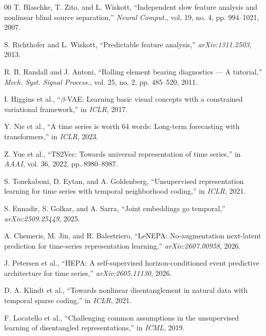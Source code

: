 \documentclass[conference]{IEEEtran}
\begin{document}
\begin{thebibliography}{00}
 T. Blaschke, T. Zito, and L. Wiskott, ``Independent slow feature analysis and nonlinear blind source separation,'' \emph{Neural Comput.}, vol. 19, no. 4, pp. 994--1021, 2007.

 S. Richthofer and L. Wiskott, ``Predictable feature analysis,'' \emph{arXiv:1311.2503}, 2013.

 R. B. Randall and J. Antoni, ``Rolling element bearing diagnostics --- A tutorial,'' \emph{Mech. Syst. Signal Process.}, vol. 25, no. 2, pp. 485--520, 2011.

 I. Higgins et al., ``$\beta$-VAE: Learning basic visual concepts with a constrained variational framework,'' in \emph{ICLR}, 2017.

 Y. Nie et al., ``A time series is worth 64 words: Long-term forecasting with transformers,'' in \emph{ICLR}, 2023.

 Z. Yue et al., ``TS2Vec: Towards universal representation of time series,'' in \emph{AAAI}, vol. 36, 2022, pp. 8980--8987.

 S. Tonekaboni, D. Eytan, and A. Goldenberg, ``Unsupervised representation learning for time series with temporal neighborhood coding,'' in \emph{ICLR}, 2021.

 S. Ennadir, S. Golkar, and A. Sarra, ``Joint embeddings go temporal,'' \emph{arXiv:2509.25449}, 2025.

 A. Chemeris, M. Jin, and R. Balestriero, ``LeNEPA: No-augmentation next-latent prediction for time-series representation learning,'' \emph{arXiv:2607.00958}, 2026.

 J. Petersen et al., ``HEPA: A self-supervised horizon-conditioned event predictive architecture for time series,'' \emph{arXiv:2605.11130}, 2026.

 D. A. Klindt et al., ``Towards nonlinear disentanglement in natural data with temporal sparse coding,'' in \emph{ICLR}, 2021.

 F. Locatello et al., ``Challenging common assumptions in the unsupervised learning of disentangled representations,'' in \emph{ICML}, 2019.

\end{thebibliography}
\end{document}
